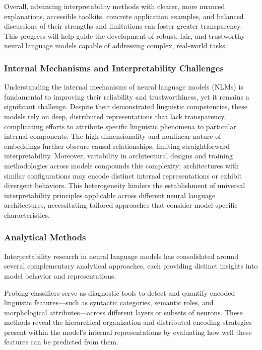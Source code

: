 \documentclass[sigconf]{acmart}
\begin{document}
Overall, advancing interpretability methods with clearer, more nuanced explanations, accessible toolkits, concrete application examples, and balanced discussions of their strengths and limitations can foster greater transparency. This progress will help guide the development of robust, fair, and trustworthy neural language models capable of addressing complex, real-world tasks.

\subsubsection{Internal Mechanisms and Interpretability Challenges}

Understanding the internal mechanisms of neural language models (NLMs) is fundamental to improving their reliability and trustworthiness, yet it remains a significant challenge. Despite their demonstrated linguistic competencies, these models rely on deep, distributed representations that lack transparency, complicating efforts to attribute specific linguistic phenomena to particular internal components. The high dimensionality and nonlinear nature of embeddings further obscure causal relationships, limiting straightforward interpretability. Moreover, variability in architectural designs and training methodologies across models compounds this complexity; architectures with similar configurations may encode distinct internal representations or exhibit divergent behaviors. This heterogeneity hinders the establishment of universal interpretability principles applicable across different neural language architectures, necessitating tailored approaches that consider model-specific characteristics.

\subsubsection{Analytical Methods}

Interpretability research in neural language models has consolidated around several complementary analytical approaches, each providing distinct insights into model behavior and representations.

Probing classifiers serve as diagnostic tools to detect and quantify encoded linguistic features—such as syntactic categories, semantic roles, and morphological attributes—across different layers or subsets of neurons. These methods reveal the hierarchical organization and distributed encoding strategies present within the model’s internal representations by evaluating how well these features can be predicted from them.
\end{document}
